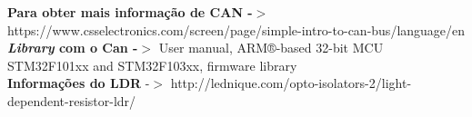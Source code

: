 


\textbf{Para obter mais informação de CAN -$>$} https://www.csselectronics.com/screen/page/simple-intro-to-can-bus/language/en
\\\textbf{\textit{Library} com o Can -$>$} User manual, ARM®-based 32-bit MCU STM32F101xx and STM32F103xx, firmware library
\\\textbf{Informações do LDR} -$>$ http://lednique.com/opto-isolators-2/light-dependent-resistor-ldr/